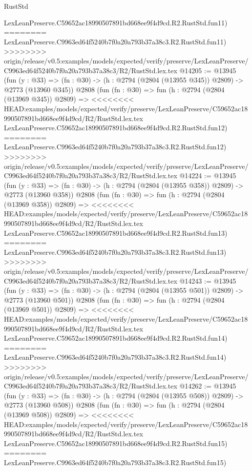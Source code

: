 \begin{lexlean}{RustStd}
\begin{coremodule}
{\begin{coremodule}
{{{{{{{{{{{{{{{{{{{{{{{{{{    LexLeanPreserve.C59652ac18990507891bd668ee9f4d9cd.R2.RustStd.fun11)
========
    LexLeanPreserve.C9963ed64f5240b7f0a20a793b37a38c3.R2.RustStd.fun11)
>>>>>>>> origin/release/v0.5:examples/models/expected/verify/preserve/LexLeanPreserve/C9963ed64f5240b7f0a20a793b37a38c3/R2/RustStd.lex.tex
@14205 := @13945
    (fun (y : @33) => (fn : @30) -> (h : @2794 (@2804 (@13955 @345)) @2809) -> @2773 (@13960 @345))
    @2808
    (fun (fn : @30) =>
    fun (h : @2794 (@2804 (@13969 @345)) @2809) =>
<<<<<<<< HEAD:examples/models/expected/verify/preserve/LexLeanPreserve/C59652ac18990507891bd668ee9f4d9cd/R2/RustStd.lex.tex
    LexLeanPreserve.C59652ac18990507891bd668ee9f4d9cd.R2.RustStd.fun12)
========
    LexLeanPreserve.C9963ed64f5240b7f0a20a793b37a38c3.R2.RustStd.fun12)
>>>>>>>> origin/release/v0.5:examples/models/expected/verify/preserve/LexLeanPreserve/C9963ed64f5240b7f0a20a793b37a38c3/R2/RustStd.lex.tex
@14224 := @13945
    (fun (y : @33) => (fn : @30) -> (h : @2794 (@2804 (@13955 @358)) @2809) -> @2773 (@13960 @358))
    @2808
    (fun (fn : @30) =>
    fun (h : @2794 (@2804 (@13969 @358)) @2809) =>
<<<<<<<< HEAD:examples/models/expected/verify/preserve/LexLeanPreserve/C59652ac18990507891bd668ee9f4d9cd/R2/RustStd.lex.tex
    LexLeanPreserve.C59652ac18990507891bd668ee9f4d9cd.R2.RustStd.fun13)
========
    LexLeanPreserve.C9963ed64f5240b7f0a20a793b37a38c3.R2.RustStd.fun13)
>>>>>>>> origin/release/v0.5:examples/models/expected/verify/preserve/LexLeanPreserve/C9963ed64f5240b7f0a20a793b37a38c3/R2/RustStd.lex.tex
@14243 := @13945
    (fun (y : @33) => (fn : @30) -> (h : @2794 (@2804 (@13955 @501)) @2809) -> @2773 (@13960 @501))
    @2808
    (fun (fn : @30) =>
    fun (h : @2794 (@2804 (@13969 @501)) @2809) =>
<<<<<<<< HEAD:examples/models/expected/verify/preserve/LexLeanPreserve/C59652ac18990507891bd668ee9f4d9cd/R2/RustStd.lex.tex
    LexLeanPreserve.C59652ac18990507891bd668ee9f4d9cd.R2.RustStd.fun14)
========
    LexLeanPreserve.C9963ed64f5240b7f0a20a793b37a38c3.R2.RustStd.fun14)
>>>>>>>> origin/release/v0.5:examples/models/expected/verify/preserve/LexLeanPreserve/C9963ed64f5240b7f0a20a793b37a38c3/R2/RustStd.lex.tex
@14262 := @13945
    (fun (y : @33) => (fn : @30) -> (h : @2794 (@2804 (@13955 @508)) @2809) -> @2773 (@13960 @508))
    @2808
    (fun (fn : @30) =>
    fun (h : @2794 (@2804 (@13969 @508)) @2809) =>
<<<<<<<< HEAD:examples/models/expected/verify/preserve/LexLeanPreserve/C59652ac18990507891bd668ee9f4d9cd/R2/RustStd.lex.tex
    LexLeanPreserve.C59652ac18990507891bd668ee9f4d9cd.R2.RustStd.fun15)
========
    LexLeanPreserve.C9963ed64f5240b7f0a20a793b37a38c3.R2.RustStd.fun15)
}}}}}}}}}}}}}}}}}}}}}}}}}}
\end{coremodule}}
\end{coremodule}
\end{lexlean}
